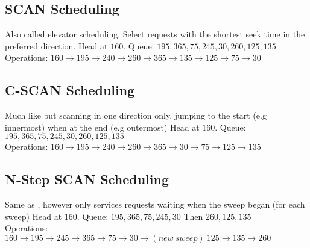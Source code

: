 \documentclass{report}
\begin{document}
        \subsection*{SCAN Scheduling}
            Also called elevator scheduling. Select requests with the shortest seek time in the preferred direction.
            Head at $160$. Queue: $195, 365, 75, 245, 30, 260, 125, 135$
            \\ Operations: $160 \to 195 \to 240 \to 260 \to 365 \to 135 \to 125 \to 75 \to 30$

        \subsection*{C-SCAN Scheduling}
            Much like  but scanning in one direction only, jumping to the start (e.g innermost) when at the end (e.g outermost)
            Head at $160$. Queue: $195, 365, 75, 245, 30, 260, 125, 135$
            \\ Operations: $160 \to 195 \to 240 \to 260 \to 365 \to 30 \to 75 \to 125 \to 135$
        
        \subsection*{N-Step SCAN Scheduling}
            Same as , however only services requests waiting when the sweep began (for each sweep)
            Head at $160$. Queue: $195, 365, 75, 245, 30$ Then $260, 125, 135$
            \\ Operations: $160 \to 195 \to 245 \to 365 \to 75 \to 30 \to (new \ sweep) \ 125 \to 135 \to 260$
\end{document}
